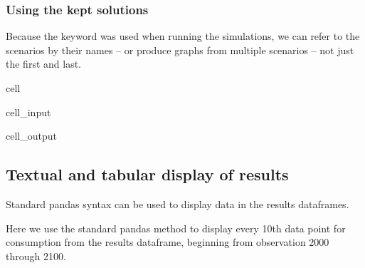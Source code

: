 \documentclass[letterpaper,10pt,english]{jupyterBook}
\begin{document}
\subsubsection{Using the kept solutions}
\label{\detokenize{content/03_Installation/TestingModelFlow:using-the-kept-solutions}}
\sphinxAtStartPar
Because the keyword  was used when running the simulations, we can refer to the scenarios by their names – or produce graphs from multiple scenarios – not just the first and last.

\begin{sphinxuseclass}{cell}\begin{sphinxVerbatimInput}

\begin{sphinxuseclass}{cell_input}
\begin{sphinxVerbatim}[commandchars=\\\{\}]
    
\end{sphinxVerbatim}

\end{sphinxuseclass}\end{sphinxVerbatimInput}
\begin{sphinxVerbatimOutput}

\begin{sphinxuseclass}{cell_output}
\noindent{}

\end{sphinxuseclass}\end{sphinxVerbatimOutput}

\end{sphinxuseclass}

\subsection{Textual and tabular display of results}
\label{\detokenize{content/03_Installation/TestingModelFlow:textual-and-tabular-display-of-results}}
\sphinxAtStartPar
Standard pandas syntax can be used to display data in the results dataframes.

\sphinxAtStartPar
Here we use the standard pandas  method to display every 10th data point for consumption from the results dataframe, beginning from observation 2000 through 2100.
\end{document}
